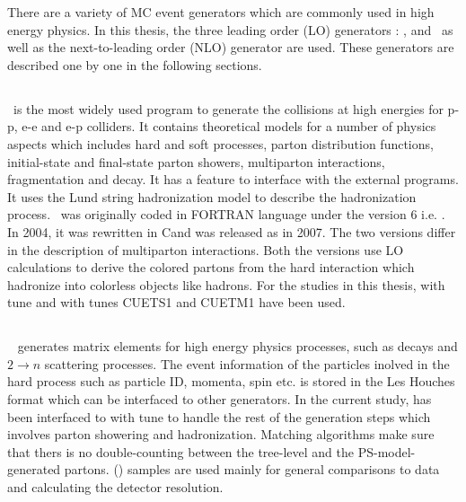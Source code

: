 There are a variety of MC event generators which are commonly used in high energy physics. In this thesis, the three leading order (LO) generators : \PYTHIA, \MadGraphF and \HERWIG~as well as the next-to-leading order (NLO) generator \POWHEG are used. These generators are described one by one in the following sections.

\subsection{\PYTHIA}
\PYTHIA~is the most widely used program to generate the collisions at high energies for p-p, e-e and e-p colliders. It contains theoretical models for a number of physics aspects which includes hard and soft processes, parton distribution functions, initial-state and final-state parton showers, multiparton interactions, fragmentation and decay. It has a feature to interface with the external programs. It uses the Lund string hadronization model \cite{Lund} to describe the hadronization process. \PYTHIA~was originally coded in FORTRAN language under the version 6 i.e. \PYTHIAS \cite{Sjostrand:2006za}. In 2004, it was rewritten in C\plusn\plus and was released as \PYTHIAE \cite{Sjostrand:2007gs} in 2007. The two versions differ in the description of multiparton interactions. Both the versions use LO calculations to derive the colored partons from the hard interaction which hadronize into colorless objects like hadrons. For the studies in this thesis, \PYTHIAS with tune \Ztwostar \cite{Field:2011iq} and \PYTHIAE with tunes CUETS1 and CUETM1 \cite{Khachatryan:2015pea} have been used. 

\subsection{\MadGraphF}
\MadGraphF~\cite{Alwall:2011uj} generates matrix elements for high energy physics processes, such as decays and $2 \rightarrow n$ scattering processes. The event information of the particles inolved in the hard process such as particle ID, momenta, spin etc. is stored in the Les Houches format \cite{Alwall:2006yp} which can be interfaced to other generators. In the current study, \MadGraphF has been interfaced to \PYTHIAS with tune \Ztwostar to handle the rest of the generation steps which involves parton showering and hadronization. Matching algorithms make sure that thers is no double-counting between the tree-level and the PS-model-generated partons. \MadGraphFn\plusn \PYTHIAS (\MGP) samples are used mainly for general comparisons to data and calculating the detector resolution. 

